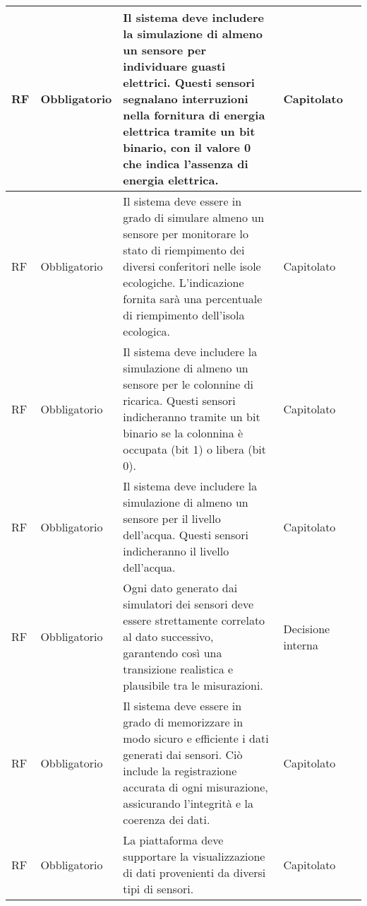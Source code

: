 \begin{longtable}{|C{1.5cm}|C{2cm}|L{5cm}|C{2cm}|C{1.5cm}|}
    \hline
     RF & Obbligatorio &  Il sistema deve includere la simulazione di almeno un sensore per individuare guasti elettrici. Questi sensori segnalano interruzioni nella fornitura di energia elettrica tramite un bit binario, con il valore 0 che indica l'assenza di energia elettrica. & Capitolato & \\
    
    \hline
     RF & Obbligatorio &  Il sistema deve essere in grado di simulare almeno un sensore per monitorare lo stato di riempimento dei diversi conferitori nelle isole ecologiche. L'indicazione fornita sarà una percentuale di riempimento dell'isola ecologica. & Capitolato & \\
    
    \hline
     RF & Obbligatorio & Il sistema deve includere la simulazione di almeno un sensore per le colonnine di ricarica. Questi sensori indicheranno tramite un bit binario se la colonnina è occupata (bit 1) o libera (bit 0). & Capitolato &  \\
    
    \hline
     RF & Obbligatorio & Il sistema deve includere la simulazione di almeno un sensore per il livello dell'acqua. Questi sensori indicheranno il livello dell'acqua. & Capitolato &  \\
    
    \hline
     RF & Obbligatorio &  Ogni dato generato dai simulatori dei sensori deve essere strettamente correlato al dato successivo, garantendo così una transizione realistica e plausibile tra le misurazioni. & Decisione interna & \\
    
    \hline
     RF & Obbligatorio & Il sistema deve essere in grado di memorizzare in modo sicuro e efficiente i dati generati dai sensori. Ciò include la registrazione accurata di ogni misurazione, assicurando l'integrità e la coerenza dei dati. & Capitolato & \\
    
    \hline
     RF & Obbligatorio & La piattaforma deve supportare la visualizzazione di dati provenienti da diversi tipi di sensori. & Capitolato & \\
    

\end{longtable}
